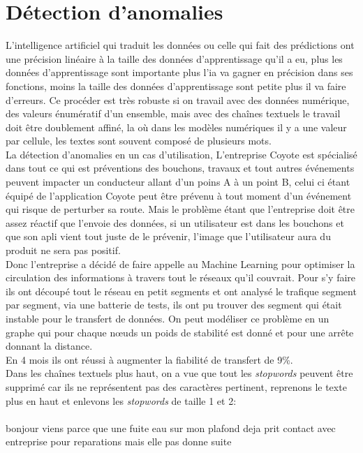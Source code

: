 \section{Détection d'anomalies}
L’intelligence artificiel qui traduit les données ou celle qui fait des prédictions ont une précision linéaire à la taille des données d'apprentissage qu'il a eu, plus les données d'apprentissage sont importante plus l'ia va gagner en précision dans ses fonctions, moins la taille des données d'apprentissage sont petite plus il va faire d'erreurs. Ce procéder est très robuste si on travail avec des données numérique, des valeurs énumératif d'un ensemble, mais avec des chaînes textuels le travail doit être doublement affiné, la où dans les modèles numériques il y a une valeur par cellule, les textes sont souvent composé de plusieurs mots.\\
\linebreak
La détection d'anomalies en un cas d'utilisation, L'entreprise Coyote  est spécialisé dans tout ce qui est préventions des bouchons, travaux et tout autres événements peuvent impacter un conducteur allant d'un poins A à un point B, celui ci étant équipé de l'application Coyote peut être prévenu à tout moment d'un événement qui risque de perturber sa route. Mais le problème étant que l'entreprise doit être assez réactif que l'envoie des données, si un utilisateur est dans les bouchons et que son apli vient tout juste de le prévenir, l'image que l'utilisateur aura du produit ne sera pas positif.\\
Donc l'entreprise a décidé de faire appelle au Machine Learning pour optimiser la circulation des informations à travers tout le réseaux qu'il couvrait. Pour s'y faire ils ont découpé tout le réseau en petit segments et ont analysé le trafique segment par segment, via une batterie de tests, ils ont pu trouver des segment qui était instable pour le transfert de données. On peut modéliser ce problème en un graphe qui pour chaque nœuds un poids de stabilité est donné et pour une arrête donnant la distance.\\
\linebreak
En 4 mois ils ont réussi à augmenter la fiabilité de transfert de 9\%.\\

Dans les chaînes textuels plus haut, on a vue que tout les \textit{stopwords} peuvent être supprimé car ils ne représentent pas des caractères pertinent, reprenons le texte plus en haut et enlevons les \textit{stopwords} de taille 1 et 2:\\
\sepline\\
bonjour viens parce que une fuite eau sur mon plafond deja prit contact avec entreprise pour reparations mais elle pas donne suite\\
\sepline
\pagebreak


